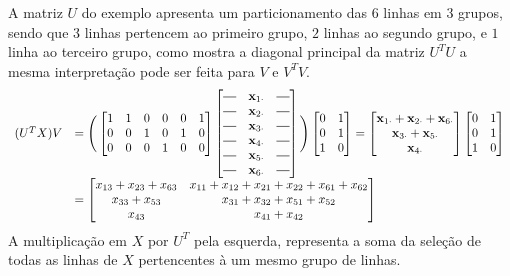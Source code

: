 \documentclass[
    12pt,                %
    oneside,            %
    a4paper,            %
    english,            %
    brazil                %
    ]{abntex2ppgsi}
\newcommand*{\horzbar}{\rule[.5ex]{2.5ex}{0.5pt}}
\begin{document}
A matriz $U$ do exemplo apresenta um particionamento das $6$ linhas em $3$ grupos, sendo que $3$ linhas pertencem ao primeiro grupo, $2$ linhas ao segundo grupo, e $1$ linha ao terceiro grupo, como mostra a diagonal principal da matriz $U^T U$ a mesma interpretação pode ser feita para $V$ e $V^T V$.
\[
\begin{array}{ll}
(U^T X) V & = \Bigg(\begin{bmatrix}
1 & 1 & 0 & 0 & 0 & 1 \\
0 & 0 & 1 & 0 & 1 & 0 \\
0 & 0 & 0 & 1 & 0 & 0
\end{bmatrix}
\begin{bmatrix}
\horzbar & \mathbf{x}_{1 \cdot} & \horzbar \\
\horzbar & \mathbf{x}_{2 \cdot} & \horzbar \\
\horzbar & \mathbf{x}_{3 \cdot} & \horzbar \\
\horzbar & \mathbf{x}_{4 \cdot} & \horzbar \\
\horzbar & \mathbf{x}_{5 \cdot} & \horzbar \\
\horzbar & \mathbf{x}_{6 \cdot} & \horzbar
\end{bmatrix}\Bigg)
\begin{bmatrix}
0 & 1 \\
0 & 1 \\
1 & 0
\end{bmatrix}
= \begin{bmatrix}
\mathbf{x}_{1 \cdot} + \mathbf{x}_{2 \cdot} + \mathbf{x}_{6 \cdot} \\
\mathbf{x}_{3 \cdot} + \mathbf{x}_{5 \cdot}                        \\
\mathbf{x}_{4 \cdot}
\end{bmatrix}
\begin{bmatrix}
0 & 1 \\
0 & 1 \\
1 & 0
\end{bmatrix} \\
& = \begin{bmatrix}
x_{13} + x_{23} + x_{63} & x_{11} + x_{12} + x_{21} + x_{22} + x_{61} + x_{62} \\
x_{33} + x_{53}          & x_{31} + x_{32} + x_{51} + x_{52}                   \\
x_{43}                   & x_{41} + x_{42}
\end{bmatrix}
\end{array}
\]
A multiplicação em $X$ por $U^T$ pela esquerda, representa a soma da seleção de todas as linhas de $X$ pertencentes à um mesmo grupo de linhas.
\end{document}
